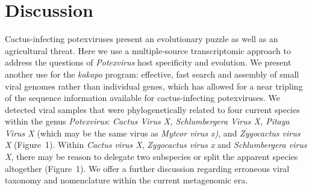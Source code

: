 \documentclass[fleqn,10pt,lineno]{wlpeerj}
\begin{document}
\section*{Discussion}
Cactus-infecting potexviruses present an evolutionary puzzle as well as an agricultural threat. 
Here we use a multiple-source transcriptomic approach to address the questions of \textit{Potexvirus} host specificity and evolution. 
We present another use for the \textit{kakapo} program: effective, fast search and assembly of small viral genomes rather than individual genes, which has allowed for a near tripling of the sequence information available for cactus-infecting potexviruses.
We detected viral samples that were phylogenetically related to four current species within the genus \textit{Potexvirus}: \textit{Cactus Virus X, Schlumbergera Virus X, Pitaya Virus X} (which may be the same virus as \textit{Mytcor virus x)}, and \textit{Zygocactus virus X} (Figure~1).
Within \textit{Cactus virus X}, \textit{Zygocactus virus x} and \textit{Schlumbergera virus X}, there may be reason to delegate two subspecies or split the apparent species altogether (Figure~1).
We offer a further discussion regarding erroneous viral taxonomy and nomenclature within the current metagenomic era.
\end{document}
